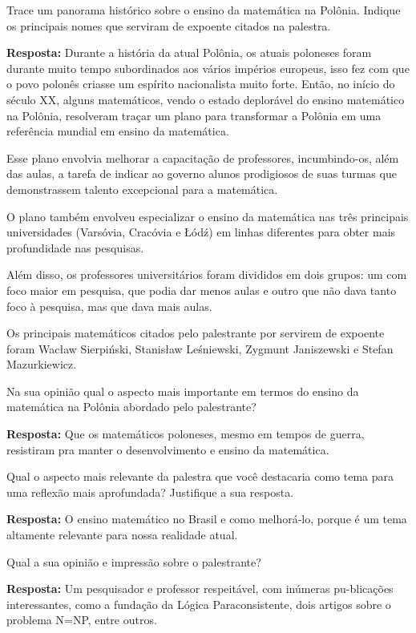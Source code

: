 \documentclass{article}
\begin{document}
\begin{enumerate}

{\bf \item Trace um panorama histórico sobre o ensino da matemática na Polônia. Indique os principais nomes que serviram de expoente citados na palestra.}

{\bf Resposta:} Durante a história da atual Polônia, os atuais poloneses foram durante muito tempo subordinados aos vários impérios europeus, isso fez com que o povo polonês criasse um espírito nacionalista muito forte. Então, no início do século XX, alguns matemáticos, vendo o estado deplorável do ensino matemático na Polônia, resolveram traçar um plano para transformar a Polônia em uma referência mundial em ensino da matemática.

Esse plano envolvia melhorar a capacitação de professores, incumbindo-os, além das aulas, a tarefa de indicar ao governo alunos prodigiosos de suas turmas que demonstrassem talento excepcional para a matemática.

O plano também envolveu especializar o ensino da matemática nas três principais universidades (Varsóvia, Cracóvia e Łódź) em linhas diferentes para obter mais profundidade nas pesquisas.

Além disso, os professores universitários foram divididos em dois grupos: um com foco maior em pesquisa, que podia dar menos aulas e outro que não dava tanto foco à pesquisa, mas que dava mais aulas.

Os principais matemáticos citados pelo palestrante por servirem de expoente foram Wacław Sierpiński, Stanisław Leśniewski, Zygmunt Janiszewski e Stefan Mazurkiewicz.

{\bf \item Na sua opinião qual o aspecto mais importante em termos do ensino da matemática na Polônia abordado pelo palestrante?}

{\bf Resposta:} Que os matemáticos poloneses, mesmo em tempos de guerra, resistiram pra manter o desenvolvimento e ensino da matemática.

{\bf \item Qual o aspecto mais relevante da palestra que você destacaria como tema para uma reflexão mais aprofundada? Justifique a sua resposta.}

{\bf Resposta:} O ensino matemático no Brasil e como melhorá-lo, porque é um tema altamente relevante para nossa realidade atual.

{\bf \item Qual a sua opinião e impressão sobre o palestrante?}

{\bf Resposta:} Um pesquisador e professor respeitável, com inúmeras pu-blicações interessantes, como a fundação da Lógica Paraconsistente, dois artigos sobre o problema N=NP, entre outros.

\end{enumerate}
\end{document}
